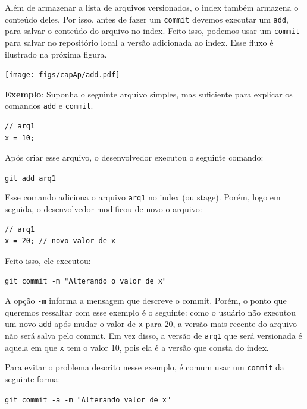 \documentclass[
  11pt,
  twoside]{book}
\newcommand{\passthrough}[1]{#1}
\let\origfigure\figure
\let\endorigfigure\endfigure
\renewenvironment{figure}[1][2] {
    \expandafter\origfigure\expandafter[!h]
} {
    \endorigfigure
}
\begin{document}
Além de armazenar a lista de arquivos versionados, o index também
armazena o conteúdo deles. Por isso, antes de fazer um
\passthrough{\lstinline!commit!} devemos executar um
\passthrough{\lstinline!add!}, para salvar o conteúdo do arquivo no
index. Feito isso, podemos usar um \passthrough{\lstinline!commit!} para
salvar no repositório local a versão adicionada ao index. Esse fluxo é
ilustrado na próxima figura.

\begin{figure}
\centering
\texttt{[image: figs/capAp/add.pdf]}
\caption{Comandos \passthrough{\lstinline!add!} e
\passthrough{\lstinline!commit!}}
\end{figure}

\textbf{Exemplo}: Suponha o seguinte arquivo simples, mas suficiente
para explicar os comandos \passthrough{\lstinline!add!} e
\passthrough{\lstinline!commit!}.

\begin{lstlisting}
// arq1 
x = 10; 
\end{lstlisting}

Após criar esse arquivo, o desenvolvedor executou o seguinte comando:

\passthrough{\lstinline!git add arq1!}

Esse comando adiciona o arquivo \passthrough{\lstinline!arq1!} no index
(ou stage). Porém, logo em seguida, o desenvolvedor modificou de novo o
arquivo:

\begin{lstlisting}
// arq1
x = 20; // novo valor de x
\end{lstlisting}

Feito isso, ele executou:

\passthrough{\lstinline!git commit -m "Alterando o valor de x"!}

A opção \passthrough{\lstinline!-m!} informa a mensagem que descreve o
commit. Porém, o ponto que queremos ressaltar com esse exemplo é o
seguinte: como o usuário não executou um novo
\passthrough{\lstinline!add!} após mudar o valor de
\passthrough{\lstinline!x!} para 20, a versão mais recente do arquivo
não será salva pelo commit. Em vez disso, a versão de
\passthrough{\lstinline!arq1!} que será versionada é aquela em que
\passthrough{\lstinline!x!} tem o valor 10, pois ela é a versão que
consta do index.

Para evitar o problema descrito nesse exemplo, é comum usar um
\passthrough{\lstinline!commit!} da seguinte forma:

\passthrough{\lstinline!git commit -a -m "Alterando valor de x"!}
\end{document}
